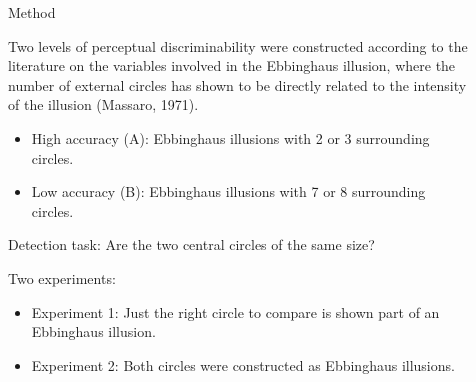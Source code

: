 \documentclass[final]{beamer}
\newlength{\sepwid}
\newlength{\onecolwid}
\newlength{\twocolwid}
\begin{document}
\begin{frame}[t]
\begin{columns}[t]
\begin{column}{\onecolwid}
\end{column} %

\begin{column}{\sepwid}\end{column} %

\begin{column}{\twocolwid} %

\begin{columns}[t,totalwidth=\twocolwid] %

\begin{column}{\onecolwid}\vspace{-.6in} %


\begin{block}{Method}

Two levels of perceptual discriminability were constructed according to the literature on the variables involved in the Ebbinghaus illusion, where the number of external circles has shown to be directly related to the intensity of the illusion (Massaro, 1971).




\begin{itemize}
\item High accuracy (A): Ebbinghaus illusions with 2 or 3 surrounding circles.
\item Low accuracy (B): Ebbinghaus illusions with 7 or 8 surrounding circles.
\end{itemize}



Detection task:  Are the two central circles of the same size?

Two experiments: 

\begin{itemize}
\item Experiment 1: Just the right circle to compare is shown part of an Ebbinghaus illusion.
\item Experiment 2: Both circles were constructed as Ebbinghaus illusions.
\end{itemize}



\end{block}
\end{column}
\end{columns}
\end{column}
\end{columns}
\end{frame}
\end{document}
